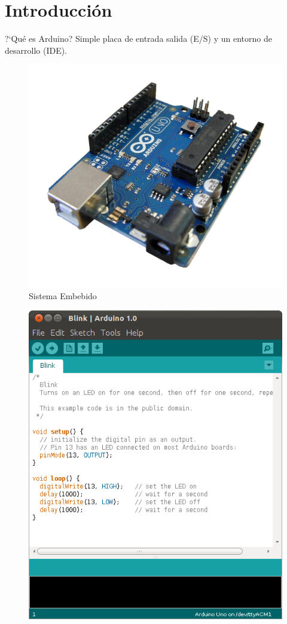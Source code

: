 \documentclass{beamer}
\begin{document}
	\section{Introducción}
	\begin{frame}{?`Qué es Arduino?}
		Simple placa de entrada salida (E/S) y un entorno de desarrollo (IDE).
		
		\begin{multicols}{2}
			\begin{figure}
				\label{fig:ard}
				\centering
				\includegraphics[scale=0.05]{arduino}
				\caption{Sistema Embebido}
			\end{figure}
			\begin{figure}
				\label{fig:ide}
				\centering
				\includegraphics[scale=0.2]{ide}

\end{figure}
\end{multicols}
\end{frame}
\end{document}
